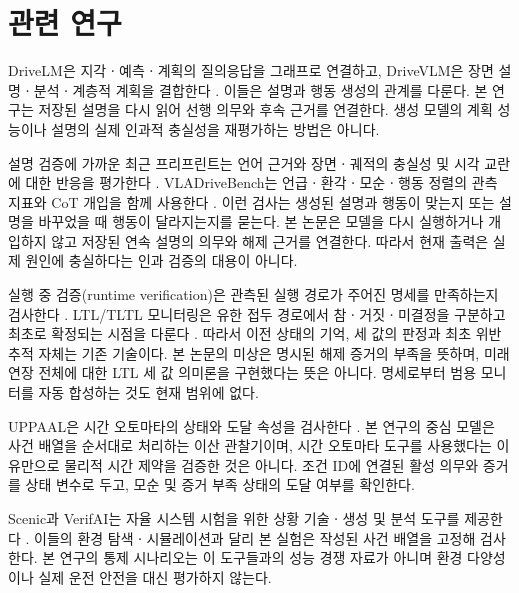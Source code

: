 \section{관련 연구}
\label{sec:related}

\begin{revision}

DriveLM은 지각ㆍ예측ㆍ계획의 질의응답을 그래프로 연결하고, DriveVLM은 장면 설명ㆍ분석ㆍ계층적 계획을 결합한다 \cite{sima2024drivelm,tian2024drivevlm}. 이들은 설명과 행동 생성의 관계를 다룬다. 본 연구는 저장된 설명을 다시 읽어 선행 의무와 후속 근거를 연결한다. 생성 모델의 계획 성능이나 설명의 실제 인과적 충실성을 재평가하는 방법은 아니다.

설명 검증에 가까운 최근 프리프린트는 언어 근거와 장면ㆍ궤적의 충실성 및 시각 교란에 대한 반응을 평가한다 \cite{mayumu2026faithfulness}. VLADriveBench는 언급ㆍ환각ㆍ모순ㆍ행동 정렬의 관측 지표와 CoT 개입을 함께 사용한다 \cite{nguyen2026vladrivebench}. 이런 검사는 생성된 설명과 행동이 맞는지 또는 설명을 바꾸었을 때 행동이 달라지는지를 묻는다. 본 논문은 모델을 다시 실행하거나 개입하지 않고 저장된 연속 설명의 의무와 해제 근거를 연결한다. 따라서 현재 출력은 실제 원인에 충실하다는 인과 검증의 대용이 아니다.

실행 중 검증(runtime verification)은 관측된 실행 경로가 주어진 명세를 만족하는지 검사한다 \cite{leucker2009runtime}. LTL/TLTL 모니터링은 유한 접두 경로에서 참ㆍ거짓ㆍ미결정을 구분하고 최초로 확정되는 시점을 다룬다 \cite{bauer2011runtime}. 따라서 이전 상태의 기억, 세 값의 판정과 최초 위반 추적 자체는 기존 기술이다. 본 논문의 미상은 명시된 해제 증거의 부족을 뜻하며, 미래 연장 전체에 대한 LTL 세 값 의미론을 구현했다는 뜻은 아니다. 명세로부터 범용 모니터를 자동 합성하는 것도 현재 범위에 없다.

UPPAAL은 시간 오토마타의 상태와 도달 속성을 검사한다 \cite{behrmann2004uppaal,uppaalqueries}. 본 연구의 중심 모델은 사건 배열을 순서대로 처리하는 이산 관찰기이며, 시간 오토마타 도구를 사용했다는 이유만으로 물리적 시간 제약을 검증한 것은 아니다. 조건 ID에 연결된 활성 의무와 증거를 상태 변수로 두고, 모순 및 증거 부족 상태의 도달 여부를 확인한다.

Scenic과 VerifAI는 자율 시스템 시험을 위한 상황 기술ㆍ생성 및 분석 도구를 제공한다 \cite{fremont2019scenic,dreossi2019verifai}. 이들의 환경 탐색ㆍ시뮬레이션과 달리 본 실험은 작성된 사건 배열을 고정해 검사한다. 본 연구의 통제 시나리오는 이 도구들과의 성능 경쟁 자료가 아니며 환경 다양성이나 실제 운전 안전을 대신 평가하지 않는다.


\end{revision}
